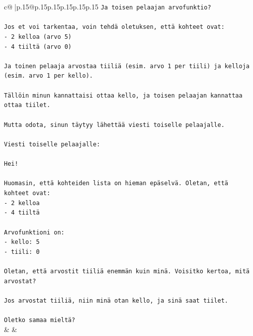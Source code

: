 \documentclass{article}
\begin{document}
{\begin{supertabular}{c@{$\;$}|p{.15\linewidth}@{}p{.15\linewidth}p{.15\linewidth}p{.15\linewidth}p{.15\linewidth}p{.15\linewidth}}
{{{\texttt{Ja toisen pelaajan arvofunktio?} \\
\\ 
\texttt{Jos et voi tarkentaa, voin tehdä oletuksen, että kohteet ovat:} \\
\texttt{{-} 2 kelloa (arvo 5)} \\
\texttt{{-} 4 tiiltä (arvo 0)} \\
\\ 
\texttt{Ja toinen pelaaja arvostaa tiiliä (esim. arvo 1 per tiili) ja kelloja (esim. arvo 1 per kello).} \\
\\ 
\texttt{Tällöin minun kannattaisi ottaa kello, ja toisen pelaajan kannattaa ottaa tiilet.} \\
\\ 
\texttt{Mutta odota, sinun täytyy lähettää viesti toiselle pelaajalle.} \\
\\ 
\texttt{Viesti toiselle pelaajalle:} \\
\\ 
\texttt{Hei!} \\
\\ 
\texttt{Huomasin, että kohteiden lista on hieman epäselvä. Oletan, että kohteet ovat:} \\
\texttt{{-} 2 kelloa} \\
\texttt{{-} 4 tiiltä} \\
\\ 
\texttt{Arvofunktioni on:} \\
\texttt{{-} kello: 5} \\
\texttt{{-} tiili: 0} \\
\\ 
\texttt{Oletan, että arvostit tiiliä enemmän kuin minä. Voisitko kertoa, mitä arvostat?} \\
\\ 
\texttt{Jos arvostat tiiliä, niin minä otan kello, ja sinä saat tiilet.} \\
\\ 
\texttt{Oletko samaa mieltä?} \\
            }
        }
    }
    & & \\ \\


\end{supertabular}}
\end{document}
